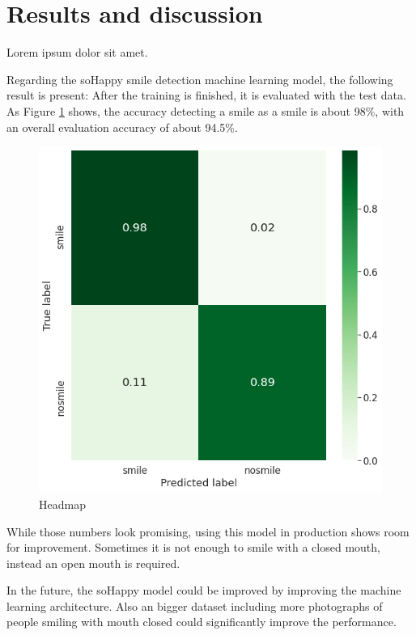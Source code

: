 \section{Results and discussion} \label{sec:results_and_discussion}
Lorem ipsum dolor sit amet.


Regarding the soHappy smile detection machine learning model, the following
result is present: After the training is finished, it is evaluated with the
test data. As Figure \ref{fig:training_result} shows, the accuracy detecting a
smile as a smile is about 98\%, with an overall evaluation accuracy of about 
94.5\%.

\begin{figure}
  \includegraphics[width=\linewidth]{figures/training_result.png}
  \caption{Headmap }
  \label{fig:training_result}
\end{figure}

While those numbers look promising, using this model in production shows
room for improvement. Sometimes it is not enough to smile with a closed
mouth, instead an open mouth is required.

In the future, the soHappy model could be improved by improving the machine 
learning architecture. Also an bigger dataset including more photographs of
people smiling with mouth closed could significantly improve the performance.